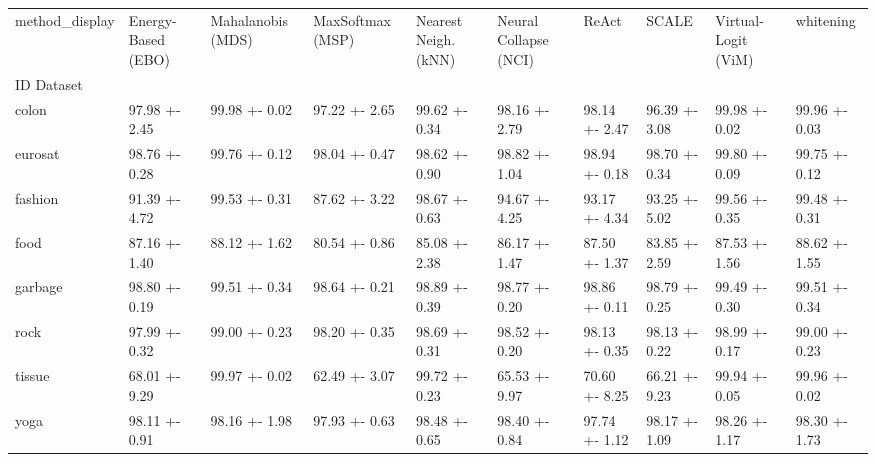 \begin{tabular}{llllllllll}
\toprule
method_display & Energy-Based (EBO) & Mahalanobis (MDS) & MaxSoftmax (MSP) & Nearest Neigh. (kNN) & Neural Collapse (NCI) & ReAct & SCALE & Virtual-Logit (ViM) & whitening \\
ID Dataset &  &  &  &  &  &  &  &  &  \\
\midrule
colon & 97.98 +- 2.45 & 99.98 +- 0.02 & 97.22 +- 2.65 & 99.62 +- 0.34 & 98.16 +- 2.79 & 98.14 +- 2.47 & 96.39 +- 3.08 & 99.98 +- 0.02 & 99.96 +- 0.03 \\
eurosat & 98.76 +- 0.28 & 99.76 +- 0.12 & 98.04 +- 0.47 & 98.62 +- 0.90 & 98.82 +- 1.04 & 98.94 +- 0.18 & 98.70 +- 0.34 & 99.80 +- 0.09 & 99.75 +- 0.12 \\
fashion & 91.39 +- 4.72 & 99.53 +- 0.31 & 87.62 +- 3.22 & 98.67 +- 0.63 & 94.67 +- 4.25 & 93.17 +- 4.34 & 93.25 +- 5.02 & 99.56 +- 0.35 & 99.48 +- 0.31 \\
food & 87.16 +- 1.40 & 88.12 +- 1.62 & 80.54 +- 0.86 & 85.08 +- 2.38 & 86.17 +- 1.47 & 87.50 +- 1.37 & 83.85 +- 2.59 & 87.53 +- 1.56 & 88.62 +- 1.55 \\
garbage & 98.80 +- 0.19 & 99.51 +- 0.34 & 98.64 +- 0.21 & 98.89 +- 0.39 & 98.77 +- 0.20 & 98.86 +- 0.11 & 98.79 +- 0.25 & 99.49 +- 0.30 & 99.51 +- 0.34 \\
rock & 97.99 +- 0.32 & 99.00 +- 0.23 & 98.20 +- 0.35 & 98.69 +- 0.31 & 98.52 +- 0.20 & 98.13 +- 0.35 & 98.13 +- 0.22 & 98.99 +- 0.17 & 99.00 +- 0.23 \\
tissue & 68.01 +- 9.29 & 99.97 +- 0.02 & 62.49 +- 3.07 & 99.72 +- 0.23 & 65.53 +- 9.97 & 70.60 +- 8.25 & 66.21 +- 9.23 & 99.94 +- 0.05 & 99.96 +- 0.02 \\
yoga & 98.11 +- 0.91 & 98.16 +- 1.98 & 97.93 +- 0.63 & 98.48 +- 0.65 & 98.40 +- 0.84 & 97.74 +- 1.12 & 98.17 +- 1.09 & 98.26 +- 1.17 & 98.30 +- 1.73 \\
\bottomrule
\end{tabular}
